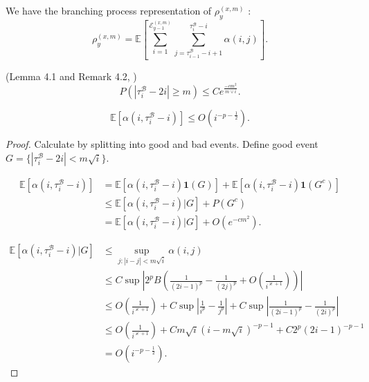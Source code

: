 We have the branching process representation of $\rho_y^{(x,m)}$ :
\[
	\rho_y^{(x,m)} = \mathbb{E}\left[ 
	\sum_{i = 1}^{\mathcal{E}_{y-1}^{(x,m)}} 
		\sum_{j = \tau_{i-1}^{\mathcal{B}}-i+1}^{\tau_i^{\mathcal{B}}-i}   
		\alpha(i, j) 
	\right] 
.\] 


\begin{lemma}
(Lemma 4.1 and Remark 4.2, \cite{kosyginaFunctionalLimitLaws2016})
	\[
		P\left( \left| \tau_i^{\mathcal{B}} - 2i\right| \ge m \right)  \le C e ^{\frac{-c m^2}{ m \vee i}}
	.\] 
	\label{lem:section-concentration}
\end{lemma}

\begin{lemma}
	\[
		\mathbb{E}\left[ \alpha\left(i, \tau_i^{\mathcal{B}} - i\right) \right] \le O(i^{-p-\frac{1}{2}})
	.\] 
	\label{lem:sectional-drift-1}
\end{lemma}
\begin{proof}
	Calculate by splitting into good and bad events. Define good event $G = \{|\tau_i^{\mathcal{B}} - 2i| < m \sqrt{ i} \} $. 

\begin{align*}
	\mathbb{E}\left[ \alpha\left(i, \tau_i^{\mathcal{B}} - i\right) \right]
	&= \mathbb{E}\left[ \alpha\left(i, \tau_i^{\mathcal{B}} - i\right) \mathbf{1}(G)\right] + \mathbb{E}\left[ \alpha\left(i, \tau_i^{\mathcal{B}} - i\right) \mathbf{1}(G^c)\right] \\
	&\le \mathbb{E}\left[ \alpha\left(i, \tau_i^{\mathcal{B}} - i\right)  | G\right] + P(G^c) \\
	&= \mathbb{E}\left[ \alpha\left(i, \tau_i^{\mathcal{B}} - i\right)  | G\right] + O(e^{-c m^2}) 
.\end{align*}

\begin{align*}
	 \mathbb{E}\left[ \alpha\left(i, \tau_i^{\mathcal{B}} - i\right)  | G\right]
	 &\le \sup _{j:|i - j| < m \sqrt{i} } \alpha(i,j) \\
	 &\le C \sup \left| 2^p B \left( \frac{1}{(2i - 1)^p}  - \frac{1}{(2j)^p} + O\left(\frac{1}{i^{\varkappa
	 + 1}}\right) \right) \right|  \\
	 &\le O\left(\frac{1}{i^{\varkappa + 1}}\right) 
	 + C \sup \left| \frac{1}{i^p} - \frac{1}{j^p}\right| + C \sup \left| \frac{1}{(2i-1)^p} - \frac{1}{(2i)^p} \right| \\
	 &\le O\left(\frac{1}{i^{\varkappa + 1}}\right) 
	 + C m \sqrt{ i} \left( i - m \sqrt{ i}  \right) ^{- p - 1} + C 2^p (2 i - 1)^{ -p - 1}\\
	 &= O\left(i^{- p - \frac{1}{2}}\right) 
.\end{align*}

\end{proof}

